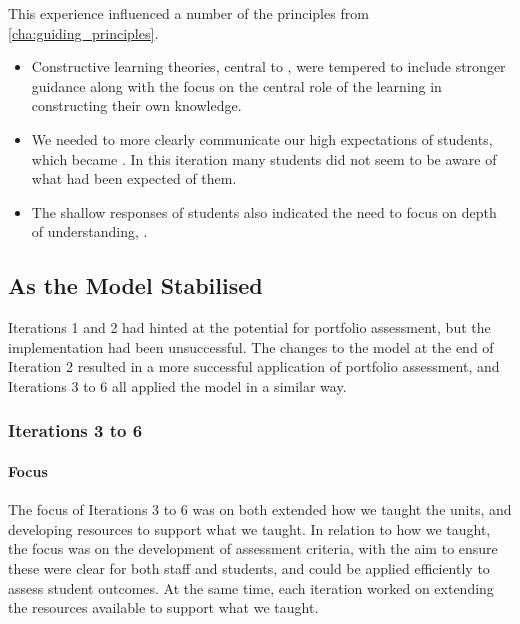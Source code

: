 This experience influenced a number of the principles from \cref{cha:guiding_principles}. 

\begin{itemize}[noitemsep,nolistsep]
	\item Constructive learning theories, central to , were tempered to include stronger guidance along with the focus on the central role of the learning in constructing their own knowledge. 
	\item We needed to more clearly communicate our high expectations of students, which became . In this iteration many students did not seem to be aware of what had been expected of them.
	\item The shallow responses of students also indicated the need to focus on depth of understanding, .
\end{itemize}



\subsection{As the Model Stabilised} %
\label{sub:as_the_model_stabilised}

Iterations 1 and 2 had hinted at the potential for portfolio assessment, but the implementation had been unsuccessful. The changes to the model at the end of Iteration 2 resulted in a more successful application of portfolio assessment, and Iterations 3 to 6 all applied the model in a similar way. 

\subsubsection{Iterations 3 to 6} %
\label{ssub:iterations_3_to_6}

\paragraph{Focus} %
\label{ssub:focus_3_6}

The focus of Iterations 3 to 6 was on both extended how we taught the units, and developing resources to support what we taught. In relation to how we taught, the focus was on the development of assessment criteria, with the aim to ensure these were clear for both staff and students, and could be applied efficiently to assess student outcomes. At the same time, each iteration worked on extending the resources available to support what we taught.


